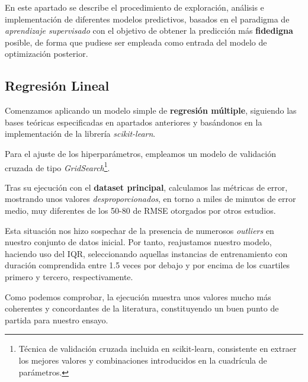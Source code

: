 En este apartado se describe el procedimiento de exploración, análisis e implementación de diferentes modelos predictivos, basados en el paradigma de \textit{aprendizaje supervisado} con el objetivo de obtener la predicción más \textbf{fidedigna} posible, de forma que pudiese ser empleada como entrada del modelo de optimización posterior.


\subsection{Regresión Lineal}

Comenzamos aplicando un modelo simple de \textbf{regresión múltiple}, siguiendo las bases teóricas especificadas en apartados anteriores y basándonos en la implementación de la librería \textit{scikit-learn}\cite{2021Scikit-LearnPython}.

Para el ajuste de los hiperparámetros, empleamos un modelo de validación cruzada de tipo \textit{GridSearch}\footnote{Técnica de validación cruzada incluida en scikit-learn, consistente en extraer los mejores valores y combinaciones introducidos en la cuadrícula de parámetros.}.

Tras su ejecución con el \textbf{dataset principal}, calculamos las métricas de error, mostrando unos valores \textit{desproporcionados}, en torno a miles de minutos de error medio, muy diferentes de los 50-80 de RMSE otorgados por otros estudios\cite{ShahabiKargar2014PredictingSurgery}.


Esta situación nos hizo sospechar de la presencia de numerosos \textit{outliers} en nuestro conjunto de datos inicial. Por tanto, reajustamos nuestro modelo, haciendo uso del IQR\cite{Bonthu2021DetectingOutliers}, seleccionando aquellas instancias de entrenamiento con duración comprendida entre 1.5 veces por debajo y por encima de los cuartiles primero y tercero, respectivamente.

Como podemos comprobar, la ejecución muestra unos valores mucho más coherentes y concordantes de la literatura, constituyendo un buen punto de partida para nuestro ensayo.


